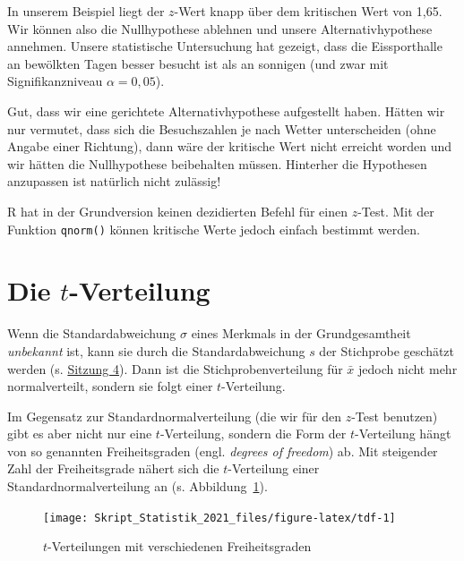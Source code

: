 \documentclass[
  11pt,
  ngerman,
  a4paper,
]{report}
\newenvironment{rtip}{
  \medskip
  \begin{tcolorbox}[colframe=purple,colback=light_gray,title=Softwarehinweis]
}{
  \end{tcolorbox}
  \medskip
}
\begin{document}
In unserem Beispiel liegt der \(z\)-Wert knapp über dem kritischen Wert von 1,65. Wir können also die Nullhypothese ablehnen und unsere Alternativhypothese annehmen. Unsere statistische Untersuchung hat gezeigt, dass die Eissporthalle an bewölkten Tagen besser besucht ist als an sonnigen (und zwar mit Signifikanzniveau \(\alpha=0,05\)).

Gut, dass wir eine gerichtete Alternativhypothese aufgestellt haben. Hätten wir nur vermutet, dass sich die Besuchszahlen je nach Wetter unterscheiden (ohne Angabe einer Richtung), dann wäre der kritische Wert nicht erreicht worden und wir hätten die Nullhypothese beibehalten müssen. Hinterher die Hypothesen anzupassen ist natürlich nicht zulässig!

\begin{rtip}
R hat in der Grundversion keinen dezidierten Befehl für einen $z$-Test. Mit der Funktion \verb|qnorm()| können kritische Werte jedoch einfach bestimmt werden.
\end{rtip}

\hypertarget{t-verteilung}{%
\section{\texorpdfstring{Die \(t\)-Verteilung}{Die t-Verteilung}}\label{t-verteilung}}

Wenn die Standardabweichung \(\sigma\) eines Merkmals in der Grundgesamtheit \emph{unbekannt} ist, kann sie durch die Standardabweichung \(s\) der Stichprobe geschätzt werden (s. \href{schätzstatistik-1.html}{Sitzung 4}). Dann ist die Stichprobenverteilung für \(\bar{x}\) jedoch nicht mehr normalverteilt, sondern sie folgt einer \(t\)-Verteilung.

Im Gegensatz zur Standardnormalverteilung (die wir für den \(z\)-Test benutzen) gibt es aber nicht nur eine \(t\)-Verteilung, sondern die Form der \(t\)-Verteilung hängt von so genannten Freiheitsgraden (engl. \emph{degrees of freedom}) ab. Mit steigender Zahl der Freiheitsgrade nähert sich die \(t\)-Verteilung einer Standardnormalverteilung an (s. Abbildung~\ref{fig:tdf}).

\begin{figure}[!h]

{\centering \texttt{[image: Skript\_Statistik\_2021\_files/figure-latex/tdf-1]} 

}

\caption{$t$-Verteilungen mit verschiedenen Freiheitsgraden}\label{fig:tdf}
\end{figure}
\end{document}
